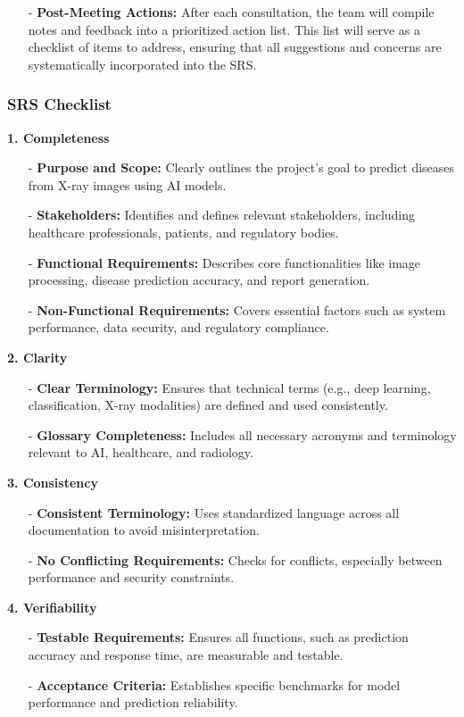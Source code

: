 \documentclass[12pt, titlepage]{article}
\begin{document}
\begin{itemize}
    \item[-] \textbf{Post-Meeting Actions:} After each consultation, the team will compile notes and feedback into a prioritized action list. This list will serve as a checklist of items to address, ensuring that all suggestions and concerns are systematically incorporated into the SRS.
\end{itemize}

\subsubsection{SRS Checklist}
\textbf{1. Completeness}
\begin{itemize}
    \item[-] \textbf{Purpose and Scope:} Clearly outlines the project's goal to predict diseases from X-ray images using AI models. 
    \item[-] \textbf{Stakeholders:} Identifies and defines relevant stakeholders, including healthcare professionals, patients, and regulatory bodies. 
    \item[-] \textbf{Functional Requirements:} Describes core functionalities like image processing, disease prediction accuracy, and report generation. 
    \item[-] \textbf{Non-Functional Requirements:} Covers essential factors such as system performance, data security, and regulatory compliance. 
\end{itemize}
\textbf{2. Clarity} 
\begin{itemize}
    \item[-] \textbf{Clear Terminology:} Ensures that technical terms (e.g., deep learning, classification, X-ray modalities) are defined and used consistently. 
    \item[-] \textbf{Glossary Completeness:} Includes all necessary acronyms and terminology relevant to AI, healthcare, and radiology. 
\end{itemize}
\textbf{3. Consistency} 
\begin{itemize}
    \item[-] \textbf{Consistent Terminology:} Uses standardized language across all documentation to avoid misinterpretation. 
    \item[-] \textbf{No Conflicting Requirements:} Checks for conflicts, especially between performance and security constraints. 
\end{itemize}
\textbf{4. Verifiability} 
\begin{itemize}
    \item[-] \textbf{Testable Requirements:} Ensures all functions, such as prediction accuracy and response time, are measurable and testable. 
    \item[-] \textbf{Acceptance Criteria:} Establishes specific benchmarks for model performance and prediction reliability. 
\end{itemize}
\end{document}
